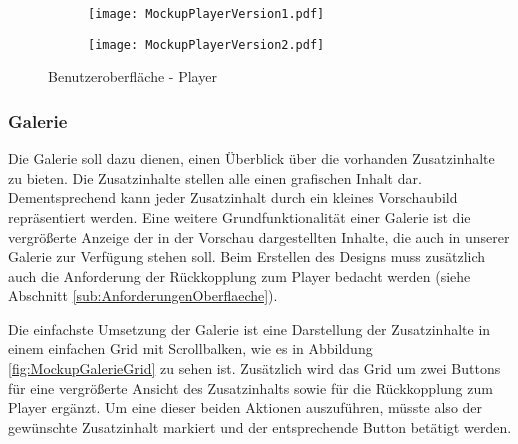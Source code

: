 \begin{figure}[h!]
\begin{subfigure}[c]{\textwidth}
\texttt{[image: MockupPlayerVersion1.pdf]}
\label{fig:MockupPlayerVersion1}
\end{subfigure}
\par\bigskip
\begin{subfigure}[c]{\textwidth}
\texttt{[image: MockupPlayerVersion2.pdf]}
\label{fig:MockupPlayerVersion2}
\end{subfigure}
\caption{Benutzeroberfläche - Player}
\label{fig:MockupPlayerVersion}
\end{figure}



\subsubsection{Galerie}
Die Galerie soll dazu dienen, einen Überblick über die vorhanden Zusatzinhalte zu bieten. Die Zusatzinhalte stellen alle einen grafischen Inhalt dar. Dementsprechend kann jeder Zusatzinhalt durch ein kleines Vorschaubild repräsentiert werden. 
Eine weitere Grundfunktionalität einer Galerie ist die vergrößerte Anzeige der in der Vorschau dargestellten Inhalte, die auch in unserer Galerie zur Verfügung stehen soll. Beim Erstellen des Designs muss zusätzlich auch die Anforderung der Rückkopplung zum Player bedacht werden (siehe Abschnitt \ref{sub:AnforderungenOberflaeche}). 

Die einfachste Umsetzung der Galerie ist eine Darstellung der Zusatzinhalte in einem einfachen Grid  mit Scrollbalken, wie es in Abbildung \ref{fig:MockupGalerieGrid} zu sehen ist. Zusätzlich wird das Grid um zwei Buttons für eine vergrößerte Ansicht des Zusatzinhalts sowie für die Rückkopplung zum Player ergänzt. Um eine dieser beiden Aktionen auszuführen, müsste also der gewünschte Zusatzinhalt markiert und der entsprechende Button betätigt werden.


